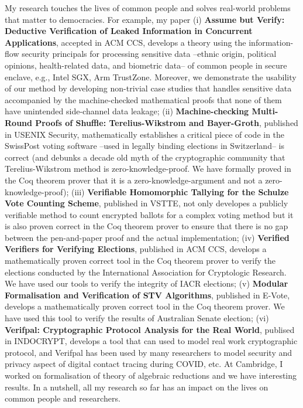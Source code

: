 \documentclass[11pt,a4paper,roman]{moderncv}
\begin{document}
My research touches the lives of common people and solves 
real-world problems that matter to democracies. For example, my paper (i)
\textbf{Assume but Verify: Deductive Verification of Leaked Information in Concurrent Applications},
accepted in ACM CCS, develops a theory using the information-flow security principals 
for processing sensitive data --ethnic origin, political opinions,
health-related data, and  biometric data-- of common 
people in secure enclave, e.g., Intel SGX, Arm TrustZone. Moreover, 
we demonstrate the usability of our method by developing non-trivial case studies that handles 
sensitive data accompanied by the machine-checked mathematical proofs that none of them have unintended side-channel 
data leakage; 
(ii) \textbf{Machine-checking Multi-Round Proofs of Shuffle: Terelius-Wikstrom and Bayer-Groth}, 
published in USENIX Security, mathematically establishes a critical piece of 
code in the SwissPost voting software --used in legally binding 
elections in Switzerland-- is correct (and debunks a decade old myth of the cryptographic 
community that Terelius-Wikstrom method is zero-knowledge-proof. We have formally 
proved in the Coq theorem prover that it is a zero-knowledge-argument and not 
a zero-knowledge-proof);
(iii) \textbf{Verifiable Homomorphic Tallying for the Schulze Vote Counting Scheme}, published 
in VSTTE, not only developes a publicly verifiable method to count encrypted ballots for a complex voting method but it 
is also proven correct in the Coq theorem prover to ensure that there is no gap between 
the pen-and-paper proof and the actual implementation;  (iv) \textbf{Verified Verifiers for 
Verifying Elections}, published in ACM CCS, develops a mathematically proven correct tool 
in the Coq theorem prover to verify the elections conducted by 
the International Association for Cryptologic Research. We have used 
our tools to verify the integrity of IACR elections; (v) \textbf{Modular Formalisation and 
Verification of STV Algorithms}, published in E-Vote, develops a mathematically proven 
correct tool in the Coq theorem prover. We have used this tool to verify
the results of Australian Senate election; 
(vi) \textbf{Verifpal: Cryptographic Protocol Analysis for the Real World}, publised in 
INDOCRYPT, develops a tool that can used to model real work cryptographic protocol, and 
Verifpal has been used by many researchers to model security and privacy aspect of 
digital contact tracing during COVID, etc. At Cambridge, I worked 
on formalisation of theory of algebraic reductions and we have interesting results. 
In a nutshell, all my research so far has an impact on the lives on common people and 
researchers. 





\vspace{0.5cm}


\makeletterclosing
\end{document}
